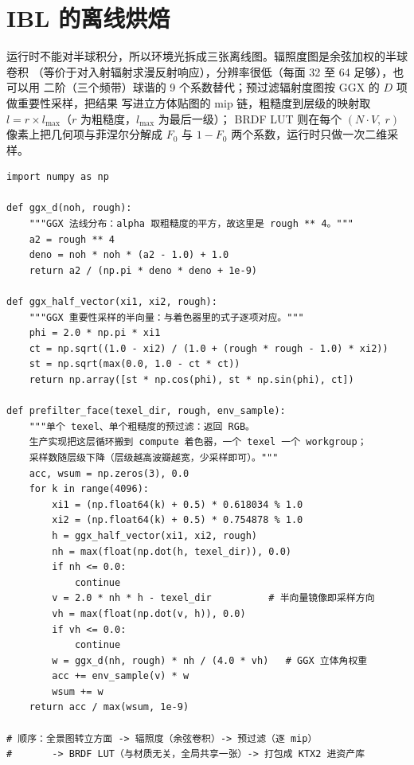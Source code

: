 \documentclass[12pt,a4paper,fontset=fandol]{ctexbook}
\begin{document}
\section{IBL 的离线烘焙}

运行时不能对半球积分，所以环境光拆成三张离线图。辐照度图是余弦加权的半球卷积
（等价于对入射辐射求漫反射响应），分辨率很低（每面 32 至 64 足够），也可以用
二阶（三个频带）球谐的 9 个系数替代；预过滤辐射度图按 GGX 的 \(D\) 项做重要性采样，把结果
写进立方体贴图的 mip 链，粗糙度到层级的映射取
\(l = r \times l_{\max}\)（\(r\) 为粗糙度，\(l_{\max}\) 为最后一级）；
BRDF LUT 则在每个
\((N\!\cdot\!V,\ r)\) 像素上把几何项与菲涅尔分解成
\(F_{0}\) 与 \(1-F_{0}\) 两个系数，运行时只做一次二维采样。

\begin{lstlisting}[style=pythonstyle,caption={离线烘焙要点：三张图的生成顺序与采样核（卷积本体在 compute 着色器里跑）},label={lst:ch12-ibl}]
import numpy as np

def ggx_d(noh, rough):
    """GGX 法线分布：alpha 取粗糙度的平方，故这里是 rough ** 4。"""
    a2 = rough ** 4
    deno = noh * noh * (a2 - 1.0) + 1.0
    return a2 / (np.pi * deno * deno + 1e-9)

def ggx_half_vector(xi1, xi2, rough):
    """GGX 重要性采样的半向量：与着色器里的式子逐项对应。"""
    phi = 2.0 * np.pi * xi1
    ct = np.sqrt((1.0 - xi2) / (1.0 + (rough * rough - 1.0) * xi2))
    st = np.sqrt(max(0.0, 1.0 - ct * ct))
    return np.array([st * np.cos(phi), st * np.sin(phi), ct])

def prefilter_face(texel_dir, rough, env_sample):
    """单个 texel、单个粗糙度的预过滤：返回 RGB。
    生产实现把这层循环搬到 compute 着色器，一个 texel 一个 workgroup；
    采样数随层级下降（层级越高波瓣越宽，少采样即可）。"""
    acc, wsum = np.zeros(3), 0.0
    for k in range(4096):
        xi1 = (np.float64(k) + 0.5) * 0.618034 % 1.0
        xi2 = (np.float64(k) + 0.5) * 0.754878 % 1.0
        h = ggx_half_vector(xi1, xi2, rough)
        nh = max(float(np.dot(h, texel_dir)), 0.0)
        if nh <= 0.0:
            continue
        v = 2.0 * nh * h - texel_dir          # 半向量镜像即采样方向
        vh = max(float(np.dot(v, h)), 0.0)
        if vh <= 0.0:
            continue
        w = ggx_d(nh, rough) * nh / (4.0 * vh)   # GGX 立体角权重
        acc += env_sample(v) * w
        wsum += w
    return acc / max(wsum, 1e-9)

# 顺序：全景图转立方面 -> 辐照度（余弦卷积）-> 预过滤（逐 mip）
#       -> BRDF LUT（与材质无关，全局共享一张）-> 打包成 KTX2 进资产库
\end{lstlisting}
\end{document}
